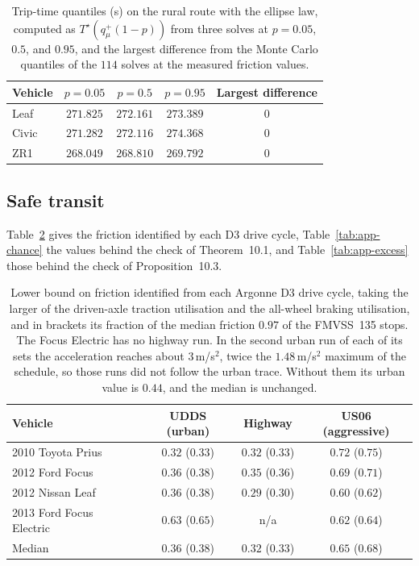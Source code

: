 \documentclass[12pt, twoside]{amsart}
\theoremstyle{definition}
\newcommand{\mainref}[2]{#2}
\begin{document}
\begin{table}[htbp]
\centering\small
\caption{Trip-time quantiles (s) on the rural route with the ellipse law, computed as $T^\star(q^{+}_\mu(1-p))$ from three solves at $p=0.05$, $0.5$, and $0.95$, and the largest difference from the Monte Carlo quantiles of the $114$ solves at the measured friction values.}\label{tab:app-transitq}
\begin{tabular}{lcccc}
\toprule
Vehicle & $p=0.05$ & $p=0.5$ & $p=0.95$ & Largest difference\\
\midrule
Leaf & $271.825$ & $272.161$ & $273.389$ & $0$\\
Civic & $271.282$ & $272.116$ & $274.368$ & $0$\\
ZR1 & $268.049$ & $268.810$ & $269.792$ & $0$\\
\bottomrule
\end{tabular}
\end{table}
\FloatBarrier

\subsection{Safe transit}

Table~\ref{tab:d3cycles} gives the friction identified by each D3 drive cycle,
Table~\ref{tab:app-chance} the values behind the check of Theorem~\mainref{thm:chance}{10.1}, and
Table~\ref{tab:app-excess} those behind the check of Proposition~\mainref{prop:excess}{10.3}.

\begin{table}[htbp]
\centering\small
\caption{Lower bound on friction identified from each Argonne D3 drive cycle, taking the larger of the driven-axle traction utilisation and the all-wheel braking utilisation, and in brackets its fraction of the median friction $0.97$ of the FMVSS~135 stops. The Focus Electric has no highway run. In the second urban run of each of its sets the acceleration reaches about $3$\,m/s$^2$, twice the $1.48$\,m/s$^2$ maximum of the schedule, so those runs did not follow the urban trace. Without them its urban value is $0.44$, and the median is unchanged.}\label{tab:d3cycles}
\begin{tabular}{lccc}
\toprule
Vehicle & UDDS (urban) & Highway & US06 (aggressive)\\
\midrule
2010 Toyota Prius & $0.32$ ($0.33$) & $0.32$ ($0.33$) & $0.72$ ($0.75$)\\
2012 Ford Focus & $0.36$ ($0.38$) & $0.35$ ($0.36$) & $0.69$ ($0.71$)\\
2012 Nissan Leaf & $0.36$ ($0.38$) & $0.29$ ($0.30$) & $0.60$ ($0.62$)\\
2013 Ford Focus Electric & $0.63$ ($0.65$) & n/a & $0.62$ ($0.64$)\\
\midrule
Median & $0.36$ ($0.38$) & $0.32$ ($0.33$) & $0.65$ ($0.68$)\\
\bottomrule
\end{tabular}
\end{table}
\end{document}
